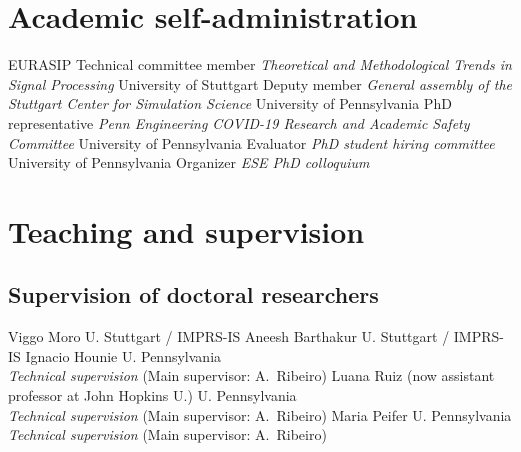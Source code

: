\documentclass{cvlfoc}
\begin{document}
\section*{Academic self-administration}

\begin{entrydate}
		{EURASIP}
		{Technical committee member}
		{\textit{Theoretical and Methodological Trends
			in Signal Processing}}
		{University of Stuttgart}
		{Deputy member}
		{\textit{General assembly of the Stuttgart Center for Simulation Science}}
		{University of Pennsylvania}
		{PhD representative}
		{\textit{Penn Engineering COVID-19 Research and Academic Safety Committee}}
		{University of Pennsylvania}
		{Evaluator}
		{\textit{PhD student hiring committee}}
		{University of Pennsylvania}
		{Organizer}
		{\textit{ESE PhD colloquium}}
\end{entrydate}



\section*{Teaching and supervision}
\vspace{0.2\baselineskip}

\subsection*{Supervision of doctoral researchers}

\begin{entrydate}
		{Viggo Moro \hfill U. Stuttgart / IMPRS-IS}
		{Aneesh Barthakur \hfill U. Stuttgart / IMPRS-IS}
		{Ignacio Hounie \hfill U. Pennsylvania\\
			\emph{Technical supervision} \hfill(Main supervisor: A.\ Ribeiro)}
		{Luana Ruiz {\small (now assistant professor at John Hopkins U.)}
			\hfill U. Pennsylvania\\
			\emph{Technical supervision} \hfill(Main supervisor: A.\ Ribeiro)}
		{Maria Peifer \hfill U. Pennsylvania\\
			\emph{Technical supervision} \hfill(Main supervisor: A.\ Ribeiro)}
\end{entrydate}
\end{document}
